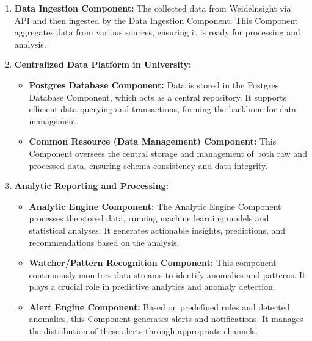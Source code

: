 \documentclass[11pt]{article}
\begin{document}
\begin{enumerate}[label=\arabic*., wide=0pt, left=0pt]

    \item \textbf{Data Ingestion Component:} The collected data from Weidelnsight via API and then ingested by the Data Ingestion Component. This Component aggregates data from various sources, ensuring it is ready for processing and analysis.

    \item \textbf{Centralized Data Platform in University:}
    \begin{itemize}
        \item \textbf{Postgres Database Component:} Data is stored in the Postgres Database Component, which acts as a central repository. It supports efficient data querying and transactions, forming the backbone for data management.
        \item \textbf{Common Resource (Data Management) Component:} This Component oversees the central storage and management of both raw and processed data, ensuring schema consistency and data integrity.
    \end{itemize}

    \item \textbf{Analytic Reporting and Processing:}
    \begin{itemize}
        \item \textbf{Analytic Engine Component:} The Analytic Engine Component processes the stored data, running machine learning models and statistical analyses. It generates actionable insights, predictions, and recommendations based on the analysis.
        \item \textbf{Watcher/Pattern Recognition Component:} This component continuously monitors data streams to identify anomalies and patterns. It plays a crucial role in predictive analytics and anomaly detection.
        \item \textbf{Alert Engine Component:} Based on predefined rules and detected anomalies, this Component generates alerts and notifications. It manages the distribution of these alerts through appropriate channels.
    \end{itemize}


\end{enumerate}
\end{document}
